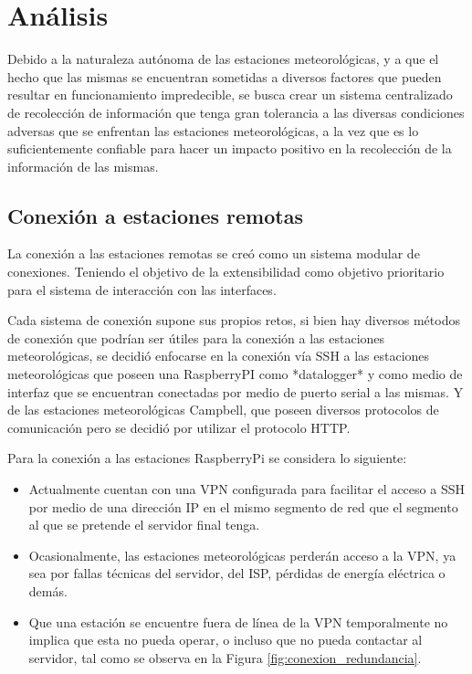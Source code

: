 
\section{Análisis}

Debido a la naturaleza autónoma de las estaciones meteorológicas, y a que el hecho que las mismas se encuentran sometidas a diversos factores que pueden resultar en funcionamiento impredecible, se busca crear un sistema centralizado de recolección de información que tenga gran tolerancia a las diversas condiciones adversas que se enfrentan las estaciones meteorológicas, a la vez que es lo suficientemente confiable para hacer un impacto positivo en la recolección de la información de las mismas.

\subsection{Conexión a estaciones remotas}


La conexión a las estaciones remotas se creó como un sistema modular de conexiones. Teniendo el objetivo de la extensibilidad como objetivo prioritario para el sistema de interacción con las interfaces.

Cada sistema de conexión supone sus propios retos, si bien hay diversos métodos de conexión que podrían ser útiles para la conexión a las estaciones meteorológicas, se decidió enfocarse en la conexión vía SSH a las estaciones meteorológicas que poseen una RaspberryPI como *datalogger* y como medio de interfaz que se encuentran conectadas por medio de puerto serial a las mismas. Y de las estaciones meteorológicas Campbell, que poseen diversos protocolos de comunicación pero se decidió por utilizar el protocolo HTTP.

Para la conexión a las estaciones RaspberryPi se considera lo siguiente:

\begin{itemize}
   \item Actualmente cuentan con una VPN configurada para facilitar el acceso a SSH por medio de una dirección IP en el mismo segmento de red que el segmento al que se pretende el servidor final tenga.
   \item Ocasionalmente, las estaciones meteorológicas perderán acceso a la VPN, ya sea por fallas técnicas del servidor, del ISP, pérdidas de energía eléctrica o demás.
   \item Que una estación se encuentre fuera de línea de la VPN temporalmente no implica que esta no pueda operar, o incluso que no pueda contactar al servidor, tal como se observa en la Figura \ref{fig:conexion_redundancia}.
\end{itemize}

